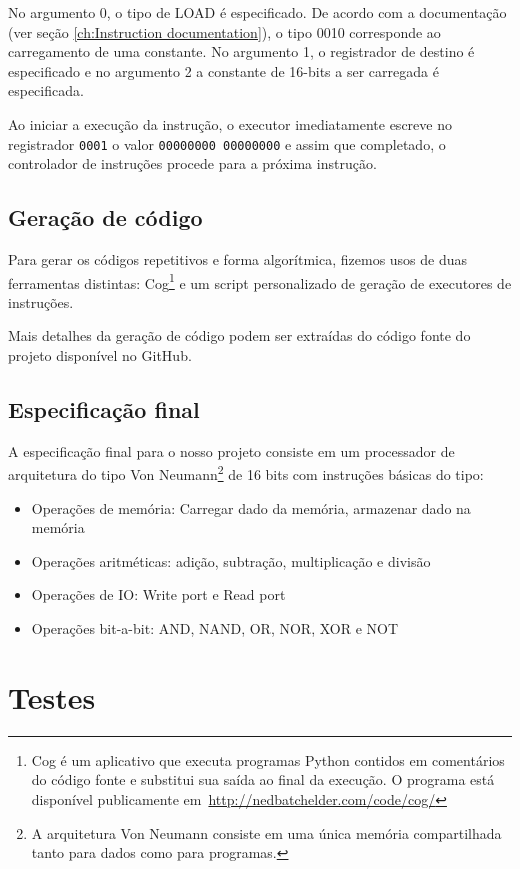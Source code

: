 \documentclass[11pt]{report}
\begin{document}
No argumento 0, o tipo de LOAD é especificado. De acordo com a documentação (ver seção \ref{ch:Instruction documentation}), o tipo 0010 corresponde ao carregamento de uma constante. No argumento 1, o registrador de destino é especificado e no argumento 2 a constante de 16-bits a ser carregada é especificada.

Ao iniciar a execução da instrução, o executor imediatamente escreve no registrador \texttt{0001} o valor \texttt{00000000 00000000} e assim que completado, o controlador de instruções procede para a próxima instrução.

\section{Geração de código}
\label{sec:CodeGeneration}
Para gerar os códigos repetitivos e forma algorítmica, fizemos usos de duas ferramentas distintas: Cog\footnote{Cog é um aplicativo que executa programas Python contidos em comentários do código fonte e substitui sua saída ao final da execução. O programa está disponível publicamente \mbox{em \url{http://nedbatchelder.com/code/cog/}}} e um script personalizado de geração de executores de instruções.

Mais detalhes da geração de código podem ser extraídas do código fonte do projeto disponível no GitHub.


\section{Especificação final}
A especificação final para o nosso projeto consiste em um processador de arquitetura do tipo Von Neumann\footnote{A arquitetura Von Neumann consiste em uma única memória compartilhada tanto para dados como para programas.} de 16 bits com instruções básicas do tipo:

\begin{itemize}
	\item Operações de memória: Carregar dado da memória, armazenar dado na memória
	\item Operações aritméticas: adição, subtração, multiplicação e divisão
	\item Operações de IO: Write port e Read port
	\item Operações bit-a-bit: AND, NAND, OR, NOR, XOR e NOT
\end{itemize}


\chapter{Testes}
\end{document}
